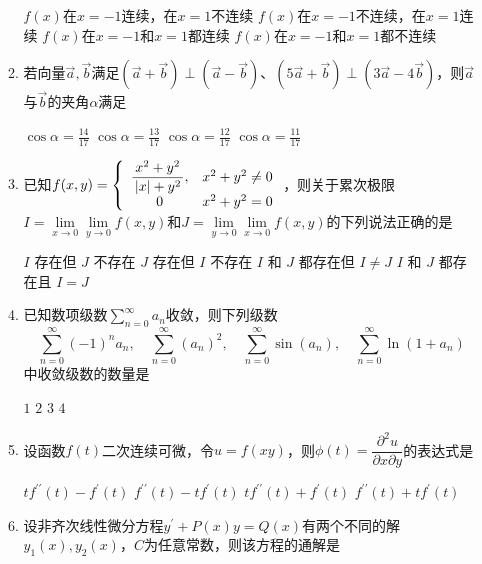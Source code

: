 \begin{enumerate}
\begin{enumerate}
\fourchoices
{$ f(x) $在$ x=-1 $连续，在$ x=1 $不连续}
{$ f(x) $在$ x=-1 $不连续，在$ x=1 $连续}
{$ f(x) $在$ x=-1 $和$ x=1 $都连续}
{$ f(x) $在$ x=-1 $和$ x=1 $都不连续}



\item 
若向量$ \vec{a},\vec{b} $满足$ (\vec{a}+\vec{b}) \perp(\vec{a}-\vec{b}) $、$ (5\vec{a}+\vec{b}) \perp (3 \vec{a}-4 \vec{b}) $，则$\vec{a}$与$\vec{b}$的夹角$  \alpha  $满足  

\fourchoices
{$\cos \alpha=\frac{14}{17}$}
{$\cos \alpha=\frac{13}{17}$}
{$\cos \alpha=\frac{12}{17}$}
{$\cos \alpha=\frac{11}{17}$}







\item 
已知$ f(x, y)=\left\{\begin{array}{cl}{\dfrac{\mathstrut x^{2}+y^{2}}{\mathstrut \left|x|+y^{2}\right.},} & {x^{2}+y^{2} \neq 0} \\ \mathstrut {0} & {x^{2}+y^{2}=0}\end{array}\right. $，则关于累次极限$ I=\lim\limits _{x \rightarrow 0} \lim\limits _{y \rightarrow 0} f(x, y) $和$ J=\lim\limits _{y \rightarrow 0 } \lim\limits_{x \rightarrow 0}f(x, y) $的下列说法正确的是  


\fourchoices
{$I$ 存在但 $J$ 不存在}
{$J$ 存在但 $I$ 不存在}
{$I$ 和 $J$ 都存在但 $I \neq J$}
{$I$ 和 $J$ 都存在且 $I=J$}



\item 
已知数项级数$ \sum\limits_{n=0}^{\infty} a_{n} $收敛，则下列级数
$$
\sum_{n=0}^{\infty}(-1)^{n} a_{n}, \quad \sum_{n=0}^{\infty}\left(a_{n}\right)^{2}, \quad  \sum_{n=0}^{\infty} \sin \left(a_{n}\right),  \quad \sum_{n=0}^{\infty} \ln \left(1+a_{n}\right)
$$
中收敛级数的数量是  


\fourchoices
{$ 1 $}
{$ 2 $}
{$ 3 $}
{$ 4 $}

\item 
设函数$ f(t) $二次连续可微，令$ u=f(xy) $，则$ \phi(t)=\dfrac{\partial^{2} u}{\partial x \partial y} $的表达式是 


\fourchoices
{$t f^{\prime \prime}(t)-f^{\prime}(t)$}
{$f^{\prime \prime}(t)-t f^{\prime}(t)$}
{$ t f^{\prime \prime}(t)+f^{\prime}(t)$}
{$ f^{\prime \prime}(t)+t f^{\prime}(t)$}


\item 
设非齐次线性微分方程$ y ^{\prime} +P(x)y=Q(x) $有两个不同的解$y_{1}(x), y_{2}(x)$，$ C $为任意常数，则该方程的通解是  



\end{enumerate}
\end{enumerate}
